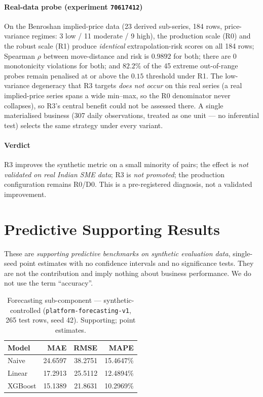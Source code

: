 \documentclass[conference]{IEEEtran}
\newcommand{\code}[1]{\texttt{#1}}
\newcommand{\expid}[1]{\texttt{#1}}
\begin{document}
\paragraph{Real-data probe (experiment \expid{70617412})}
On the Benroshan implied-price data (23 derived sub-series, 184 rows,
price-variance regimes: 3 low / 11 moderate / 9 high), the production scale (R0)
and the robust scale (R1) produce \emph{identical} extrapolation-risk scores on
all 184 rows; Spearman $\rho$ between move-distance and risk is $0.9892$ for
both; there are 0 monotonicity violations for both; and $82.2\%$ of the 45
extreme out-of-range probes remain penalised at or above the $0.15$ threshold
under R1. The low-variance degeneracy that R3 targets \emph{does not occur} on
this real series (a real implied-price series spans a wide min--max, so the R0
denominator never collapses), so R3's central benefit could not be assessed
there. A single materialised business (307 daily observations, treated as one
unit --- no inferential test) selects the same strategy under every variant.

\paragraph{Verdict}
R3 improves the synthetic metric on a small minority of pairs; the effect is
\emph{not validated on real Indian SME data}; R3 is \emph{not promoted}; the
production configuration remains R0/D0. This is a pre-registered diagnosis, not a
validated improvement.

\section{Predictive Supporting Results}
\label{sec:predictive}

These are \emph{supporting predictive benchmarks on synthetic evaluation data},
single-seed point estimates with no confidence intervals and no significance
tests. They are not the contribution and imply nothing about business
performance. We do not use the term ``accuracy''.

\begin{table}[!t]
\caption{Forecasting sub-component --- synthetic-controlled
(\code{platform-forecasting-v1}, 265 test rows, seed 42). Supporting; point
estimates.}
\label{tab:forecast}
\centering
\renewcommand{\arraystretch}{1.2}
\begin{tabular}{@{}lrrr@{}}
\toprule
Model & MAE & RMSE & MAPE\\
\midrule
Naive   & 24.6597 & 38.2751 & 15.4647\%\\
Linear  & 17.2913 & 25.5112 & 12.4894\%\\
XGBoost & 15.1389 & 21.8631 & 10.2969\%\\
\bottomrule
\end{tabular}
\end{table}
\end{document}
